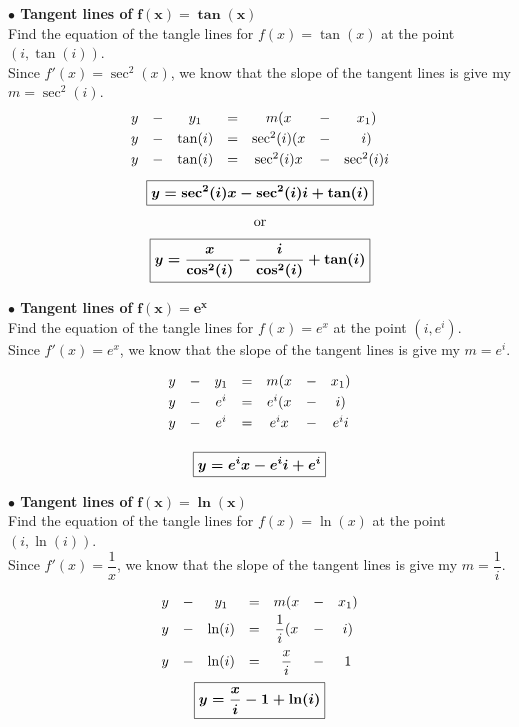 \documentclass[letterpaper]{article}
\begin{document}
\bigskip
\bigskip

\textbf{$\bullet$ Tangent lines of} $\boldsymbol{f(x)=\tan(x)}$ \\

Find the equation of the tangle lines for $f(x)=\tan(x)$ at the point $(i,\tan(i))$. \\[.1cm]

Since $f'(x)=\sec^2(x)$, we know that the slope of the tangent lines is give my $m=\sec^2(i)$. 
\[ \begin{array}{*{7}c}
	y & - & y_1 & = & m(x & - & x_1 )  \\[0.1cm]
	y & - & \tan(i) & = & \sec^2(i)(x & - & i )  \\[0.1cm]
	y & - & \tan(i) & = & \sec^2(i)x & - & \sec^2(i)i \\[0.3cm]
	\multicolumn{7}{c}{
		\boxed{\boldsymbol{y=\sec^2(i)x-\sec^2(i)i+\tan(i)}}
	} \\[0.3cm] 
	\multicolumn{7}{c}{\mbox{or}} \\[0.2cm] 
	\multicolumn{7}{c}{
		\boxed{\boldsymbol{y=\dfrac{x}{\cos^2(i)}-\dfrac{i}{\cos^2(i)}+\tan(i)}}
	} \\[0.1cm] 		
\end{array} \]


\newpage

\textbf{$\bullet$ Tangent lines of} $\boldsymbol{f(x)=e^x}$ \\

Find the equation of the tangle lines for $f(x)=e^x$ at the point $(i,e^i)$. \\[.1cm]

Since $f'(x)=e^x$, we know that the slope of the tangent lines is give my $m=e^i$. 

\[ \begin{array}{*{7}c}
	y & - & y_1 & = & m(x & - & x_1 )  \\[0.1cm]
	y & - & e^i & = & e^i(x & - & i )  \\[0.1cm]
	y & - & e^i & = & e^ix & - & e^ii  \\[0.5cm]
	\multicolumn{7}{c}{
		\boxed{\boldsymbol{y=e^ix-e^ii+e^i}}
	}
\end{array} \]

\bigskip
\bigskip

\textbf{$\bullet$ Tangent lines of} $\boldsymbol{f(x)=\ln(x)}$ \\

Find the equation of the tangle lines for $f(x)=\ln(x)$ at the point $(i,\ln(i))$. \\[.1cm]

Since $f'(x)=\dfrac{1}{x}$, we know that the slope of the tangent lines is give my $m=\dfrac{1}{i}$. 

\[ \begin{array}{*{7}c}
	y & - & y_1 & = & m(x & - & x_1 )  \\[0.1cm]
	y & - & \ln(i) & = & \dfrac{1}{i}(x & - & i )  \\[0.3cm]
	y & - & \ln(i) & = & \dfrac{x}{i} & - & 1  \\[0.3cm] 
	\multicolumn{7}{c}{
		\boxed{\boldsymbol{y=\dfrac{x}{i}-1+\ln(i)}}
	}
\end{array} \]
\end{document}
